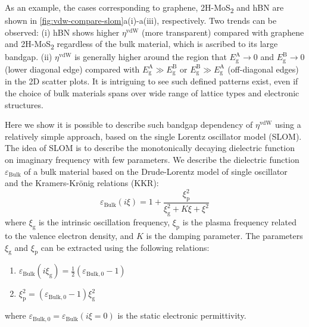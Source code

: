 As an example, the cases corresponding to graphene,
2H-MoS\textsubscript{2} and hBN are shown in
\autoref{fig:vdw-compare-slom}a(i)-a(iii), respectively.
%
Two trends can be observed: (i) hBN shows higher $\eta^{\mathrm{vdW}}$
(more transparent) compared with graphene and 2H-MoS\textsubscript{2}
regardless of the bulk material, which is ascribed to its large
bandgap. (ii) $\eta^{\mathrm{vdW}}$ is generally higher around the
region that \(E_{\mathrm{g}}^{\mathrm{A}} \to 0\) and
\(E_{\mathrm{g}}^{\mathrm{B}} \to 0\) (lower diagonal edge) compared
with \(E_{\mathrm{g}}^{\mathrm{A}} \gg E_{\mathrm{g}}^{\mathrm{B}}\)
or \(E_{\mathrm{g}}^{\mathrm{B}} \gg E_{\mathrm{g}}^{\mathrm{A}}\)
(off-diagonal edges) in the 2D scatter plots.
%
It is intriguing to see such defined patterns exist, even if the
choice of bulk materials spans over wide range of lattice types and
electronic structures.

Here we show it is possible to describe such bandgap dependency of
$\eta^{\mathrm{vdW}}$ using a relatively simple approach, based on the
single Lorentz oscillator model (SLOM).
%
The idea of SLOM is to describe the monotonically decaying dielectric
function on imaginary frequency with few parameters. We describe the
dielectric function $\varepsilon_{\mathrm{Bulk}}$ of a bulk material
based on the Drude-Lorentz model of single
oscillator~\cite{jackson_classical_1999} and the Kramers-Krönig
relations (KKR):
\begin{equation}
\label{eq:vdw-lorentz-imag}
\varepsilon_{\mathrm{Bulk}}(i \xi) 
=
1 + \frac{\xi_{\mathrm{p}}^{2}}{\xi_{\mathrm{g}}^{2} + K \xi + \xi^{2}}
\end{equation}
where \(\xi_{\mathrm{g}}\) is the intrinsic oscillation frequency,
\(\xi_{\mathrm{p}}\) is the plasma frequency related to the valence
electron density, and \(K\) is the damping parameter.
%
The parameters
\(\xi_{\mathrm{g}}\) and \(\xi_{\mathrm{p}}\) can be extracted using
the following relations:
\begin{enumerate}
\item \(\varepsilon_{\mathrm{Bulk}}(i \xi_{\mathrm{g}}) = \frac{1}{2} (\varepsilon_{\mathrm{Bulk, 0}} - 1)\)
\item \(\xi_{\mathrm{p}}^{2} = (\varepsilon_{\mathrm{Bulk, 0}} - 1) \xi_{\mathrm{g}}^{2}\)
\end{enumerate}
where
$\varepsilon_{\mathrm{Bulk, 0}} = \varepsilon_{\mathrm{Bulk}}(i\xi =
0)$ is the static electronic permittivity.
%

